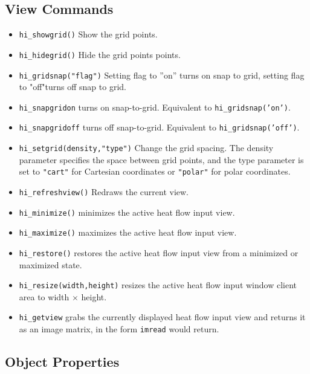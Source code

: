 \subsection{View Commands}
\begin{itemize}
\item \texttt{hi\_showgrid()} Show the grid points.

\item \texttt{hi\_hidegrid()} Hide the grid points points.

\item \texttt{hi\_gridsnap("flag")} Setting flag to ''on'' turns on snap to grid,
setting flag to "off"turns off snap to grid.

\item{\tt hi\_snapgridon} turns on snap-to-grid. Equivalent to {\tt hi\_gridsnap('on')}.

\item{\tt hi\_snapgridoff} turns off snap-to-grid. Equivalent to {\tt hi\_gridsnap('off')}.

\item \texttt{hi\_setgrid(density,"type")} Change the grid spacing. The density
parameter specifies the space between grid points, and the type
parameter is set to \texttt{"cart"} for Cartesian coordinates or
\texttt{"polar"} for polar coordinates.

\item \texttt{hi\_refreshview()} Redraws the current view.

\item{\tt hi\_minimize()} minimizes the active heat flow input view.

\item{\tt hi\_maximize()} maximizes the active heat flow input view.

\item{\tt hi\_restore()} restores the active heat flow input view from a
 minimized or maximized state.

\item{\tt hi\_resize(width,height)} resizes the active heat flow input
 window client area to width $\times$ height.
\item{\tt hi\_getview} grabs the currently displayed heat flow input view and
 returns it as an image matrix, in the form \texttt{imread} would return.

\end{itemize}


\subsection{Object Properties}

